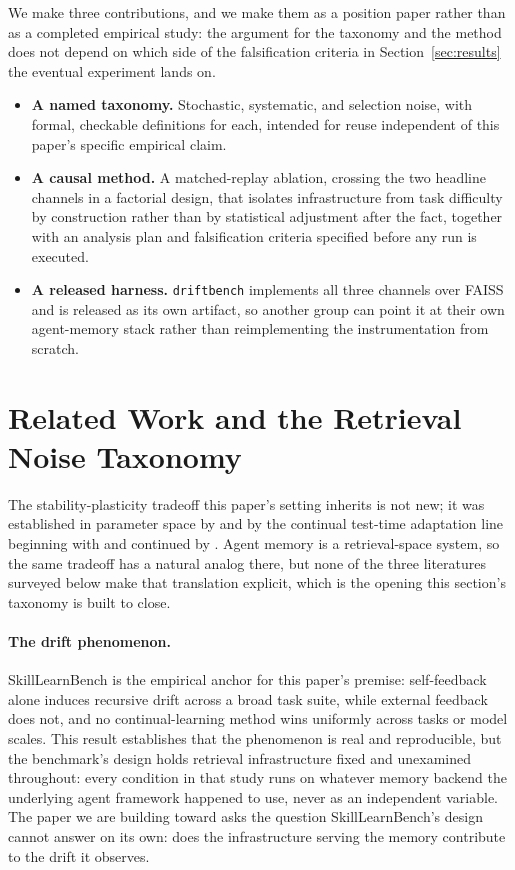 \documentclass{article}
\begin{document}
We make three contributions, and we make them as a position paper rather than as a completed empirical study: the argument for the taxonomy and the method does not depend on which side of the falsification criteria in Section~\ref{sec:results} the eventual experiment lands on.

\begin{itemize}
  \item \textbf{A named taxonomy.} Stochastic, systematic, and selection noise, with formal, checkable definitions for each, intended for reuse independent of this paper's specific empirical claim.
  \item \textbf{A causal method.} A matched-replay ablation, crossing the two headline channels in a factorial design, that isolates infrastructure from task difficulty by construction rather than by statistical adjustment after the fact, together with an analysis plan and falsification criteria specified before any run is executed.
  \item \textbf{A released harness.} \texttt{driftbench} implements all three channels over FAISS and is released as its own artifact, so another group can point it at their own agent-memory stack rather than reimplementing the instrumentation from scratch.
\end{itemize}

\section{Related Work and the Retrieval Noise Taxonomy}
\label{sec:related}

The stability-plasticity tradeoff this paper's setting inherits is not new; it was established in parameter space by \citet{kirkpatrick2017ewc} and by the continual test-time adaptation line beginning with \citet{wang2021tent} and continued by \citet{wang2022cotta}. Agent memory is a retrieval-space system, so the same tradeoff has a natural analog there, but none of the three literatures surveyed below make that translation explicit, which is the opening this section's taxonomy is built to close.

\paragraph{The drift phenomenon.} SkillLearnBench \citep{skillearnbench2026} is the empirical anchor for this paper's premise: self-feedback alone induces recursive drift across a broad task suite, while external feedback does not, and no continual-learning method wins uniformly across tasks or model scales. This result establishes that the phenomenon is real and reproducible, but the benchmark's design holds retrieval infrastructure fixed and unexamined throughout: every condition in that study runs on whatever memory backend the underlying agent framework happened to use, never as an independent variable. The paper we are building toward asks the question SkillLearnBench's design cannot answer on its own: does the infrastructure serving the memory contribute to the drift it observes.
\end{document}
